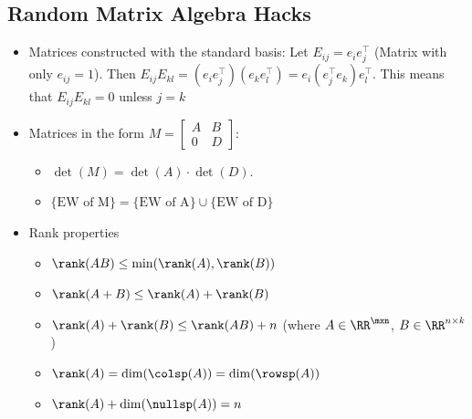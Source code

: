 \subsection{Random Matrix Algebra Hacks}
\begin{itemize}
    \item Matrices constructed with the standard basis:
        Let $E_{ij} = e_i e_j^\top$ (Matrix with only $e_{ij} = 1$).
        Then $E_{ij} E_{kl} = (e_i e_j^\top)(e_k e_l^\top) = e_i(e_j^\top e_k)e_l^\top$.
        This means that $E_{ij}E_{kl} = 0$ unless $j = k$
    \item Matrices in the form $M = \begin{bmatrix} A & B \\ 0 & D\end{bmatrix}$:
        \begin{itemize}
            \item $\det(M) = \det(A)\cdot \det(D)$.
            \item $\{\text{EW of M}\} = \{\text{EW of A}\} \cup \{\text{EW of D}\}$
        \end{itemize}
    \item Rank properties
        \begin{itemize}
            \item $\rank(AB)\le \min(\rank(A), \rank(B))$
            \item $\rank(A+B)\le \rank(A)+\rank(B)$
            \item $\rank(A) + \rank(B)\le \rank(AB) + n$ (where $A \in \RR^{\mxn}$, $B \in \RR^{n \times k}$)
            \item $\rank(A) = \dim(\colsp(A)) = \dim(\rowsp(A))$
            \item $\rank(A) + \dim(\nullsp(A)) = n$
        \end{itemize}
\end{itemize}
